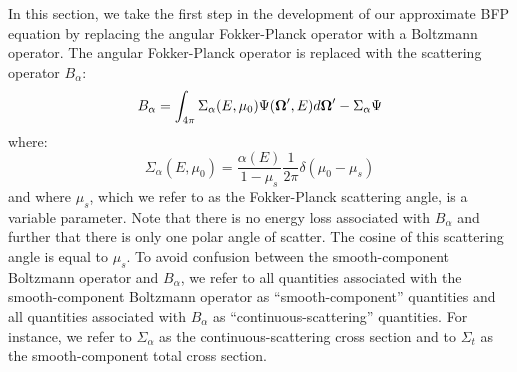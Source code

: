 In this section, we take the first step in the development of our approximate
BFP equation by replacing the angular Fokker-Planck operator with a Boltzmann
operator. The angular Fokker-Planck operator is replaced with the scattering
operator $B_{\alpha}$:
\begin{equation}
B_{\alpha} = \int_{4\pi} \Sigma_{\alpha} (E,\mu_0)
\Psi(\boldsymbol{\Omega}',E)d\boldsymbol{\Omega}'-\Sigma_{\alpha}\Psi
\end{equation}
where:
\begin{equation}
\Sigma_{\alpha}(E,\mu_0) = \frac{\alpha(E)}{1-\mu_s} \frac{1}{2\pi}
\delta(\mu_0-\mu_s)
\end{equation}
and where $\mu_s$, which we refer to as the Fokker-Planck scattering angle, is
a variable parameter. Note that there is no energy loss associated with
$B_{\alpha}$ and further that there is only one polar angle of scatter. The
cosine of this scattering angle is equal to $\mu_s$. To avoid confusion
between the smooth-component Boltzmann operator and $B_{\alpha}$, we refer to
all quantities associated with the smooth-component Boltzmann operator as
``smooth-component'' quantities and all quantities associated with
$B_{\alpha}$ as ``continuous-scattering'' quantities. For instance, we refer
to $\Sigma_{\alpha}$ as the continuous-scattering cross section and to
$\Sigma_t$ as the smooth-component total cross section.

